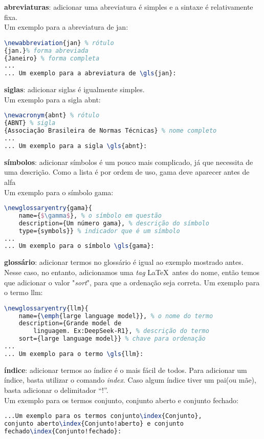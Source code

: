 \begin{alineas}
	\item \textbf{abreviaturas}: adicionar uma abreviatura é simples e a sintaxe é relativamente fixa.\\ Um exemplo para a abreviatura de \gls{jan}:
		\begin{lstlisting}[language=tex]
\newabbreviation{jan} % rótulo
{jan.}% forma abreviada
{Janeiro} % forma completa
...
... Um exemplo para a abreviatura de \gls{jan}:
		\end{lstlisting}
	
	\item \textbf{siglas}: adicionar siglas é igualmente simples.\\ 
	Um exemplo para a sigla \gls{abnt}:
	\begin{lstlisting}[language=tex]
\newacronym{abnt} % rótulo
{ABNT} % sigla
{Associação Brasileira de Normas Técnicas} % nome completo
...
... Um exemplo para a sigla \gls{abnt}:
	\end{lstlisting}
	
	\item \textbf{símbolos}: adicionar símbolos é um pouco mais complicado, já que necessita de uma descrição. Como a lista é por ordem de uso, \gls{gama} deve aparecer antes de \gls{alfa}\\ 
	Um exemplo para o símbolo \gls{gama}:
	\begin{lstlisting}[language=tex]
\newglossaryentry{gama}{
	name={$\gamma$}, % o símbolo em questão
	description={Um número gama}, % descrição do símbolo
	type={symbols}} % indicador que é um símbolo
...
... Um exemplo para o símbolo \gls{gama}:
	\end{lstlisting}
	
	\item \textbf{glossário}: adicionar termos no glossário é igual ao exemplo mostrado antes.\\
	Nesse caso, no entanto, adicionamos uma \emph{tag} \LaTeX\ antes do nome, então temos que adicionar o valor "\emph{sort}", para que a ordenação seja correta.
	Um exemplo para o termo \gls{llm}:
	\begin{lstlisting}[language=tex]
\newglossaryentry{llm}{
	name={\emph{large language model}}, % o nome do termo
	description={Grande model de 
		linguagem. Ex:DeepSeek-R1}, % descrição do termo
	sort={large language model}} % chave para ordenação
...
... Um exemplo para o termo \gls{llm}:
	\end{lstlisting}
	
	\item \textbf{índice}: adicionar termos ao índice é o mais fácil de todos. Para adicionar um índice, basta utilizar o comando \emph{index}. Caso algum índice tiver um pai(ou mãe), basta adicionar o delimitador ``!''.\\
	Um exemplo para os termos conjunto, conjunto aberto e conjunto fechado:
	\begin{lstlisting}[language=tex]
...Um exemplo para os termos conjunto\index{Conjunto},
conjunto aberto\index{Conjunto!aberto} e conjunto 
fechado\index{Conjunto!fechado}:
	\end{lstlisting}
	

\end{alineas}
